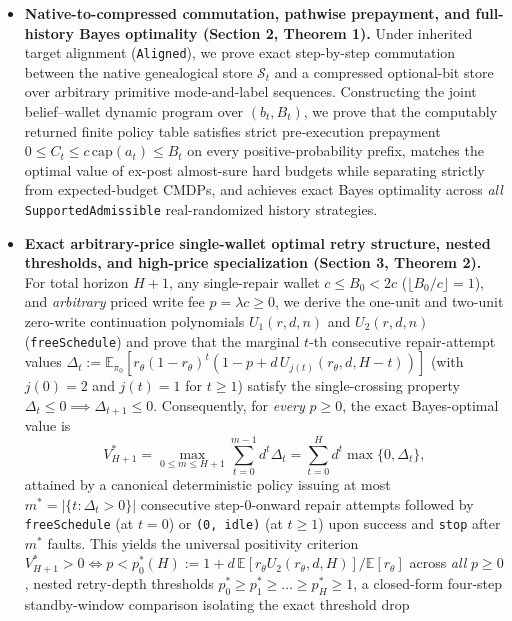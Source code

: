 \documentclass[11pt,letterpaper]{article}
\providecommand{\tightlist}{\setlength{\itemsep}{2pt}\setlength{\parskip}{0pt}}
\begin{document}
\begin{itemize}
\tightlist
\item
  \textbf{Native-to-compressed commutation, pathwise prepayment, and
  full-history Bayes optimality (Section 2, Theorem 1).} Under inherited
  target alignment (\texttt{Aligned}), we prove exact step-by-step
  commutation between the native genealogical store \(\mathcal{S}_t\)
  and a compressed optional-bit store over arbitrary primitive
  mode-and-label sequences. Constructing the joint belief--wallet
  dynamic program over \((b_t, B_t)\), we prove that the computably
  returned finite policy table satisfies strict pre-execution prepayment
  \(0 \le C_t \le c\,\mathrm{cap}(a_t) \le B_t\) on every
  positive-probability prefix, matches the optimal value of ex-post
  almost-sure hard budgets while separating strictly from
  expected-budget CMDPs, and achieves exact Bayes optimality across
  \emph{all} \texttt{SupportedAdmissible} real-randomized history
  strategies.
\item
  \textbf{Exact arbitrary-price single-wallet optimal retry structure,
  nested thresholds, and high-price specialization (Section 3, Theorem
  2).} For total horizon \(H+1\), any single-repair wallet
  \(c \le B_0 < 2c\) (\(\lfloor B_0/c\rfloor = 1\)), and
  \emph{arbitrary} priced write fee \(p = \lambda c \ge 0\), we derive
  the one-unit and two-unit zero-write continuation polynomials
  \(U_1(r,d,n)\) and \(U_2(r,d,n)\) (\texttt{freeSchedule}) and prove
  that the marginal \(t\)-th consecutive repair-attempt values
  \(\Delta_t := \mathbb{E}_{\pi_0}[r_\theta(1-r_\theta)^t(1 - p + d\,U_{j(t)}(r_\theta, d, H-t))]\)
  (with \(j(0)=2\) and \(j(t)=1\) for \(t \ge 1\)) satisfy the
  single-crossing property
  \(\Delta_t \le 0 \implies \Delta_{t+1} \le 0\). Consequently, for
  \emph{every} \(p \ge 0\), the exact Bayes-optimal value is
  \[V_{H+1}^* = \max_{0 \le m \le H+1} \sum_{t=0}^{m-1} d^t \Delta_t = \sum_{t=0}^{H} d^t \max\{0, \Delta_t\},\]
  attained by a canonical deterministic policy issuing at most
  \(m^* = |\{t : \Delta_t > 0\}|\) consecutive step-\(0\)-onward repair
  attempts followed by \texttt{freeSchedule} (at \(t=0\)) or
  \texttt{(0,\ idle)} (at \(t \ge 1\)) upon success and \texttt{stop}
  after \(m^*\) faults. This yields the universal positivity criterion
  \(V_{H+1}^* > 0 \iff p < p_0^*(H) := 1 + d\,\mathbb{E}[r_\theta U_2(r_\theta, d, H)]/\mathbb{E}[r_\theta]\)
  across \emph{all} \(p \ge 0\), nested retry-depth thresholds
  \(p_0^* \ge p_1^* \ge \dots \ge p_H^* \ge 1\), a closed-form four-step
  standby-window comparison isolating the exact threshold drop

\end{itemize}
\end{document}
